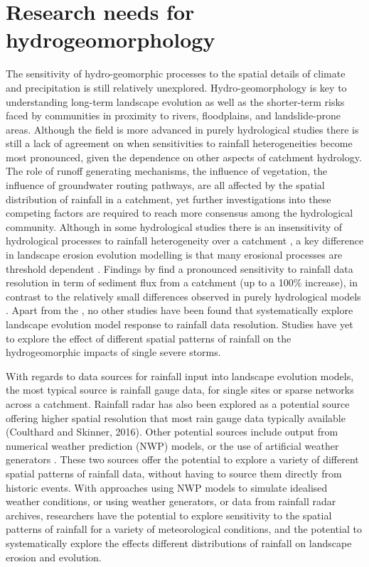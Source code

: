 \section{Research needs for hydrogeomorphology}

The sensitivity of hydro-geomorphic processes to the spatial details of climate and precipitation is still relatively unexplored. Hydro-geomorphology is key to understanding long-term landscape evolution as well as the shorter-term risks faced by communities in proximity to rivers, floodplains, and landslide-prone areas. Although the field is more advanced in purely hydrological studies \citep{krajewski1991monte,smith2005field,segond2007simulation,nicotina2008impact} there is still a lack of agreement on when sensitivities to rainfall heterogeneities become most pronounced, given the dependence on other aspects of catchment hydrology. The role of runoff generating mechanisms, the influence of vegetation, the influence of groundwater routing pathways, are all affected by the spatial distribution of rainfall in a catchment, yet further investigations into these competing factors are required to reach more consensus among the hydrological community. Although in some hydrological studies there is an insensitivity of hydrological processes to rainfall heterogeneity over a catchment \citep{krajewski1991monte,smith2005field}, a key difference in landscape erosion evolution modelling is that many erosional processes are threshold dependent \citep{snyder2003importance}. Findings by \citet{coulthard2016sensitivity} find a pronounced sensitivity to rainfall data resolution in term of sediment flux from a catchment (up to a 100\% increase), in contrast to the relatively small differences observed in purely hydrological models \citep[e.g.][]{nicotina2008impact}. Apart from the \citet{coulthard2016sensitivity}, no other studies have been found that systematically explore landscape evolution model response to rainfall data resolution. Studies have yet to explore the effect of different spatial patterns of rainfall on the hydrogeomorphic impacts of single severe storms. 

With regards to data sources for rainfall input into landscape evolution models, the most typical source is rainfall gauge data, for single sites or sparse networks across a catchment. Rainfall radar has also been explored as a potential source offering higher spatial resolution that most rain gauge data typically available (Coulthard and Skinner, 2016). Other potential sources include output from numerical weather prediction (NWP) models, or the use of artificial weather generators \citep[e.g.][]{Peleg2014}. These two sources offer the potential to explore a variety of different spatial patterns of rainfall data, without having to source them directly from historic events. With approaches using NWP models to simulate idealised weather conditions, or using weather generators, or data from rainfall radar archives, researchers have the potential to explore sensitivity to the spatial patterns of rainfall for a variety of meteorological conditions, and the potential to systematically explore the effects different distributions of rainfall on landscape erosion and evolution. 

